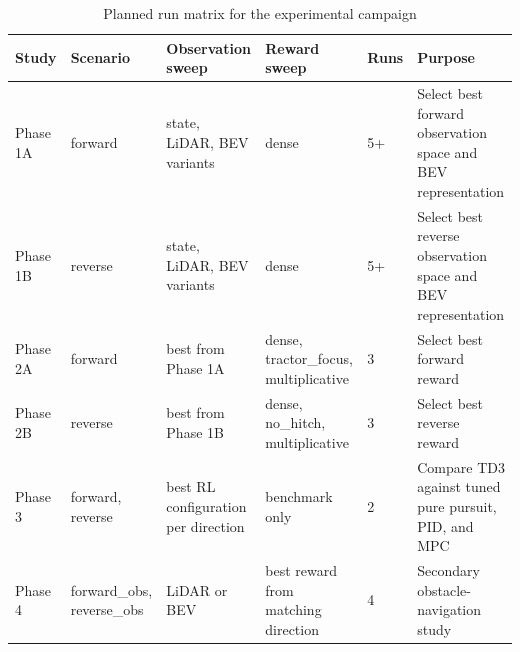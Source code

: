 \begin{table}[H]
\centering
\caption{Planned run matrix for the experimental campaign}
\label{tab:results_plan_matrix}
\begin{tabular}{p{3.4cm} p{2.2cm} p{2.6cm} p{2.8cm} p{1.3cm} p{2.6cm}}
\toprule
Study & Scenario & Observation sweep & Reward sweep & Runs & Purpose \\
\midrule
Phase 1A & forward & state, LiDAR, BEV variants & dense & 5+ & Select best forward observation space and BEV representation \\
Phase 1B & reverse & state, LiDAR, BEV variants & dense & 5+ & Select best reverse observation space and BEV representation \\
Phase 2A & forward & best from Phase 1A & dense, tractor\_focus, multiplicative & 3 & Select best forward reward \\
Phase 2B & reverse & best from Phase 1B & dense, no\_hitch, multiplicative & 3 & Select best reverse reward \\
Phase 3 & forward, reverse & best RL configuration per direction & benchmark only & 2 & Compare TD3 against tuned pure pursuit, PID, and MPC \\
Phase 4 & forward\_obs, reverse\_obs & LiDAR or BEV & best reward from matching direction & 4 & Secondary obstacle-navigation study \\
\bottomrule
\end{tabular}
\end{table}
